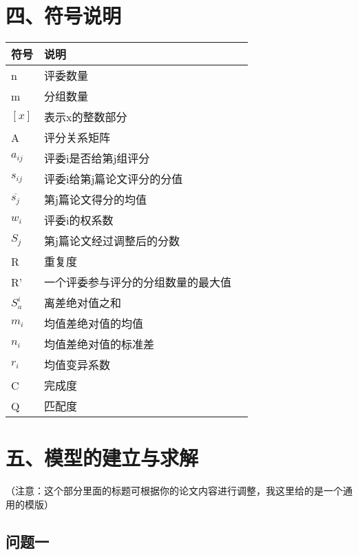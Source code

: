 \documentclass{my_paper}
\begin{document}
	\section{四、符号说明}
	\begin{table}[htbp]%
		\centering
		\begin{tabular}{p{2.0cm}<{\centering}p{9.0cm}<{\centering}p{2.0cm}<{\centering}}
			\hline
			符号 & 说明 &  \\ %
			\hline
			n & 评委数量 & \\
			m & 分组数量 & \\
			$[x]$ & 表示x的整数部分 & \\
			A & 评分关系矩阵 & \\
			$a_{ij}$ & 评委i是否给第j组评分 & \\
			$s_{ij}$ & 评委i给第j篇论文评分的分值 & \\
			$\overline{s_j}$ & 第j篇论文得分的均值 & \\
			$w_i$ & 评委i的权系数 & \\
			$S_j$ & 第j篇论文经过调整后的分数 & \\
			R & 重复度& \\
			R' & 一个评委参与评分的分组数量的最大值 & \\
			$S_a^i$ & 离差绝对值之和 & \\
			$m_i$ & 均值差绝对值的均值 & \\
			$n_i$ & 均值差绝对值的标准差 & \\
			$r_i$ & 均值变异系数 & \\
			C & 完成度 & \\
			Q & 匹配度 & \\
			
			\hline
		\end{tabular}
	\end{table}
	
	\section{五、模型的建立与求解}
	
	（注意：这个部分里面的标题可根据你的论文内容进行调整，我这里给的是一个通用的模版）
	
	\subsection{问题一}
\end{document}
